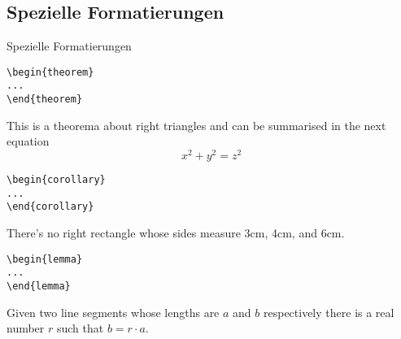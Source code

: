 \subsection{Spezielle Formatierungen}
\begin{frame}[fragile]{Spezielle Formatierungen}
\begin{minipage}{0.3\linewidth}
\begin{lstlisting}[style=tex]
\begin{theorem}
...
\end{theorem}
\end{lstlisting}
\end{minipage}
\hfill
\begin{minipage}{0.65\linewidth}
\begin{theorem}
This is a theorema about right triangles and can be summarised in the next 
equation 
\[ x^2 + y^2 = z^2 \]
\end{theorem}
\end{minipage}

\begin{minipage}{0.3\linewidth}
\begin{lstlisting}[style=tex]
\begin{corollary}
...
\end{corollary}
\end{lstlisting}
\end{minipage}
\hfill
\begin{minipage}{0.65\linewidth}
\begin{corollary}
There's no right rectangle whose sides measure 3cm, 4cm, and 6cm.
\end{corollary}
\end{minipage}

\begin{minipage}{0.3\linewidth}
\begin{lstlisting}[style=tex]
\begin{lemma}
...
\end{lemma}
\end{lstlisting}
\end{minipage}
\hfill
\begin{minipage}{0.65\linewidth}
\begin{lemma}
Given two line segments whose lengths are $a$ and $b$ respectively there is a 
real number $r$ such that $b=r\cdot a$.
\end{lemma}
\end{minipage}
\end{frame}

